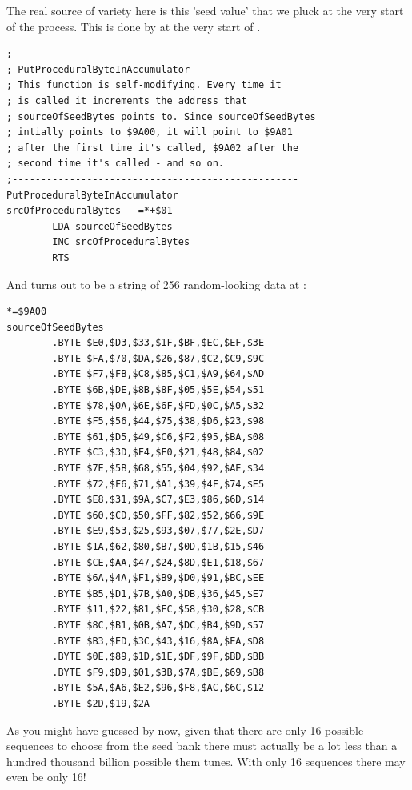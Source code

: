 The real source of variety here is this 'seed value' that we pluck at the very start of the process.
This is done by  at the very start of .

\begin{lstlisting}[caption= Our seed value ultimately comes from \icode{sourceOfSeedBytes}.]
;-------------------------------------------------
; PutProceduralByteInAccumulator
; This function is self-modifying. Every time it
; is called it increments the address that
; sourceOfSeedBytes points to. Since sourceOfSeedBytes
; intially points to $9A00, it will point to $9A01
; after the first time it's called, $9A02 after the
; second time it's called - and so on.
;--------------------------------------------------
PutProceduralByteInAccumulator
srcOfProceduralBytes   =*+$01
        LDA sourceOfSeedBytes
        INC srcOfProceduralBytes
        RTS
\end{lstlisting}

And  turns out to be a string of 256 random-looking data at :

\begin{lstlisting}[caption=Our seed value ultimately comes from \icode{sourceOfSeedBytes}.]
*=$9A00
sourceOfSeedBytes
        .BYTE $E0,$D3,$33,$1F,$BF,$EC,$EF,$3E
        .BYTE $FA,$70,$DA,$26,$87,$C2,$C9,$9C
        .BYTE $F7,$FB,$C8,$85,$C1,$A9,$64,$AD
        .BYTE $6B,$DE,$8B,$8F,$05,$5E,$54,$51
        .BYTE $78,$0A,$6E,$6F,$FD,$0C,$A5,$32
        .BYTE $F5,$56,$44,$75,$38,$D6,$23,$98
        .BYTE $61,$D5,$49,$C6,$F2,$95,$BA,$08
        .BYTE $C3,$3D,$F4,$F0,$21,$48,$84,$02
        .BYTE $7E,$5B,$68,$55,$04,$92,$AE,$34
        .BYTE $72,$F6,$71,$A1,$39,$4F,$74,$E5
        .BYTE $E8,$31,$9A,$C7,$E3,$86,$6D,$14
        .BYTE $60,$CD,$50,$FF,$82,$52,$66,$9E
        .BYTE $E9,$53,$25,$93,$07,$77,$2E,$D7
        .BYTE $1A,$62,$80,$B7,$0D,$1B,$15,$46
        .BYTE $CE,$AA,$47,$24,$8D,$E1,$18,$67
        .BYTE $6A,$4A,$F1,$B9,$D0,$91,$BC,$EE
        .BYTE $B5,$D1,$7B,$A0,$DB,$36,$45,$E7
        .BYTE $11,$22,$81,$FC,$58,$30,$28,$CB
        .BYTE $8C,$B1,$0B,$A7,$DC,$B4,$9D,$57
        .BYTE $B3,$ED,$3C,$43,$16,$8A,$EA,$D8
        .BYTE $0E,$89,$1D,$1E,$DF,$9F,$BD,$BB
        .BYTE $F9,$D9,$01,$3B,$7A,$BE,$69,$B8
        .BYTE $5A,$A6,$E2,$96,$F8,$AC,$6C,$12
        .BYTE $2D,$19,$2A
\end{lstlisting}

As you might have guessed by now, given that there are only 16 possible sequences to choose from the seed bank there must
actually be a lot less than a hundred thousand billion possible them tunes. With only 16 sequences there may even be
only 16!

